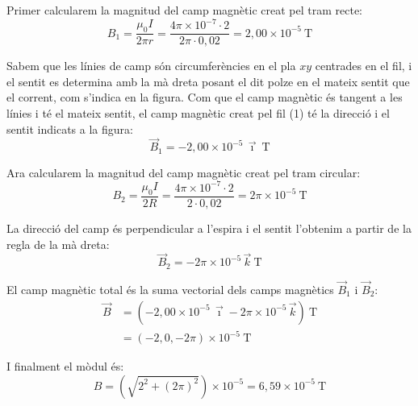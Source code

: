 \begin{solapartat}
 Primer calcularem la magnitud del camp magnètic creat pel tram recte:
\[ B_1 = \frac{\mu_0 I}{2\pi r} = \frac{4\pi\times 10^{-7}\cdot 2}{2\pi\cdot 0,02} = 2,00\times 10^{-5}\ \mathrm{T} \]

 Sabem que les línies de camp són circumferències en el pla $xy$ centrades en el fil, i el sentit es determina amb la mà dreta posant el dit polze en el mateix sentit que el corrent, com s'indica en la figura.
Com que el camp magnètic és tangent a les línies i té el mateix sentit, el camp magnètic creat pel fil (1) té la direcció i el sentit indicats a la figura:
\[ \vec{B}_1 = -2,00\times 10^{-5}\,\vec{\imath}\ \mathrm{T} \]

 Ara calcularem la magnitud del camp magnètic creat pel tram circular:
\[ B_2 = \frac{\mu_0 I}{2R} = \frac{4\pi\times 10^{-7}\cdot 2}{2\cdot 0,02} = 2\pi\times 10^{-5}\ \mathrm{T} \]

 La direcció del camp és perpendicular a l'espira i el sentit l'obtenim a partir de la regla de la mà dreta:
\[ \vec{B}_2 = -2\pi\times 10^{-5}\,\vec{k}\ \mathrm{T} \]

 El camp magnètic total és la suma vectorial dels camps magnètics $\vec{B}_1$ i $\vec{B}_2$:
\begin{align*}
\vec{B} &= \left(-2,00\times 10^{-5}\,\vec{\imath} - 2\pi\times 10^{-5}\,\vec{k}\right)\ \mathrm{T}\\
&= (-2, 0, -2\pi)\times 10^{-5}\ \mathrm{T}
\end{align*}

 I finalment el mòdul és:
\[ B = \left(\sqrt{2^2 + (2\pi)^2}\right)\times 10^{-5} = 6,59\times 10^{-5}\ \mathrm{T} \]
\end{solapartat}

